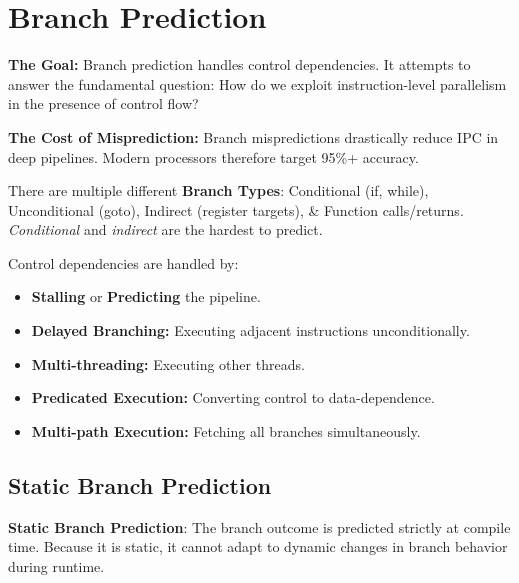 \section{Branch Prediction}

\begin{remark}
    \textbf{The Goal:} Branch prediction handles control dependencies. It attempts to answer the fundamental question: How do we exploit instruction-level parallelism in the presence of control flow?
\end{remark}

\begin{remark}
    \textbf{The Cost of Misprediction:} Branch mispredictions drastically reduce IPC in deep pipelines. Modern processors therefore target 95\%+ accuracy.
\end{remark}

\begin{definition}
    There are multiple different \textbf{Branch Types}: Conditional (if, while), Unconditional (goto), Indirect (register targets), \& Function calls/returns. \textit{Conditional} and \textit{indirect} are the hardest to predict.
\end{definition}

\begin{remark}
    Control dependencies are handled by:
    \begin{itemize}
        \item \textbf{Stalling} or \textbf{Predicting} the pipeline.
        \item \textbf{Delayed Branching:} Executing adjacent instructions unconditionally.
        \item \textbf{Multi-threading:} Executing other threads.
        \item \textbf{Predicated Execution:} Converting control to data-dependence.
        \item \textbf{Multi-path Execution:} Fetching all branches simultaneously.
    \end{itemize}
\end{remark}

\subsection{Static Branch Prediction}

\begin{definition}
    \textbf{Static Branch Prediction}: The branch outcome is predicted strictly at compile time. Because it is static, it cannot adapt to dynamic changes in branch behavior during runtime.
\end{definition}

